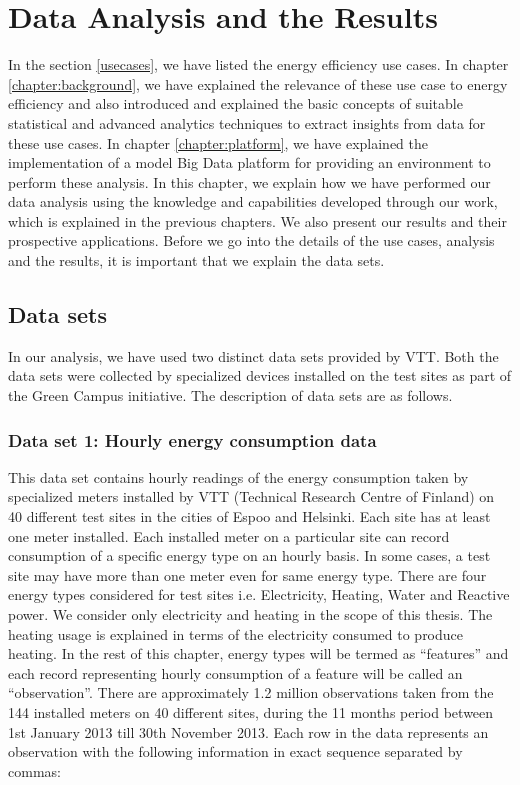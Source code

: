 \chapter{Data Analysis and the Results}
\label{chapter:Analysis}

In the section \ref{usecases}, we have listed the energy efficiency use cases. In chapter \ref{chapter:background}, we have explained the relevance of these use case to energy efficiency and also introduced and explained the basic concepts of suitable statistical and advanced analytics techniques to extract insights from data for these use cases. In chapter \ref{chapter:platform}, we have explained the implementation of a model Big Data platform for providing an environment to perform these analysis. In this chapter, we explain how we have performed our data analysis using the knowledge and capabilities developed through our work, which is explained in the previous chapters. We also present our results and their prospective applications. Before we go into the details of the use cases, analysis and the results, it is important that we explain the data sets.

\section{Data sets} \label{datasets}
In our analysis, we have used two distinct data sets provided by VTT. Both the data sets were collected by specialized devices installed on the test sites as part of the Green Campus initiative. The description of data sets are as follows.

\subsection{Data set 1: Hourly energy consumption data}
This data set contains hourly readings of the energy consumption taken by specialized meters installed by VTT (Technical Research Centre of Finland) on 40 different test sites in the cities of Espoo and Helsinki. Each site has at least one meter installed. Each installed meter on a particular site can record consumption of a specific energy type on an hourly basis. In some cases, a test site may have more than one meter even for same energy type. There are four energy types considered for test sites i.e. Electricity, Heating, Water and Reactive power. We consider only electricity and heating in the scope of this thesis. The heating usage is explained in terms of the electricity consumed to produce heating.  In the rest of this chapter, energy types will be termed as ``features'' and each record representing hourly consumption of a feature will be called an ``observation''.
There are approximately 1.2 million observations taken from the 144 installed meters on 40 different sites, during the 11 months period between 1st January 2013 till 30th November 2013.  Each row in the data represents an observation with the following information in exact sequence separated by commas: 

